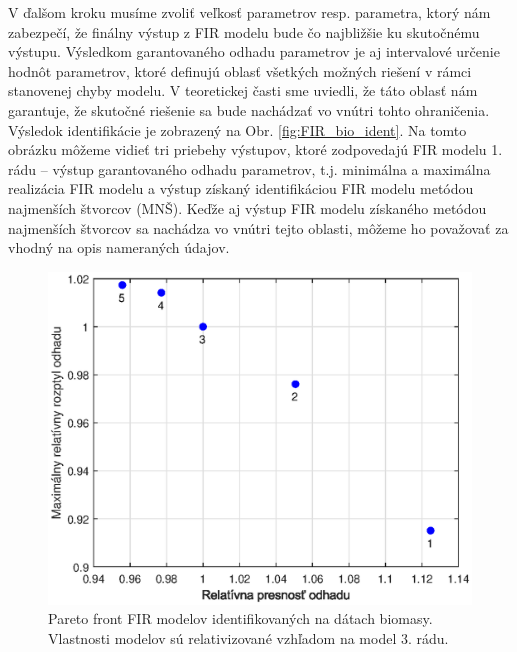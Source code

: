 V ďalšom kroku musíme zvoliť veľkosť parametrov resp. parametra, ktorý nám zabezpečí, že finálny výstup z FIR modelu bude čo najbližšie ku skutočnému výstupu. Výsledkom garantovaného odhadu parametrov je aj intervalové určenie hodnôt parametrov, ktoré definujú oblasť všetkých možných riešení v rámci stanovenej chyby modelu. V teoretickej časti sme uviedli, že táto oblasť nám garantuje, že skutočné riešenie sa bude nachádzať vo vnútri tohto ohraničenia. Výsledok identifikácie je zobrazený na Obr. \ref{fig:FIR_bio_ident}. Na tomto obrázku môžeme vidieť tri priebehy výstupov, ktoré zodpovedajú FIR modelu 1. rádu -- výstup garantovaného odhadu parametrov, t.j. minimálna a maximálna realizácia FIR modelu a výstup získaný identifikáciou FIR modelu metódou najmenších štvorcov (MNŠ). Keďže aj výstup FIR modelu získaného metódou najmenších štvorcov sa nachádza vo vnútri tejto oblasti, môžeme ho považovať za vhodný na opis nameraných údajov.
\begin{figure}
	\centering
	\includegraphics[width=0.7\linewidth]{images/FIR_bio_pareto}
	\caption{Pareto front FIR modelov identifikovaných na dátach biomasy. Vlastnosti modelov sú relativizované vzhľadom na model 3. rádu.}
	\label{fig:FIR_bio_pareto}
\end{figure}

